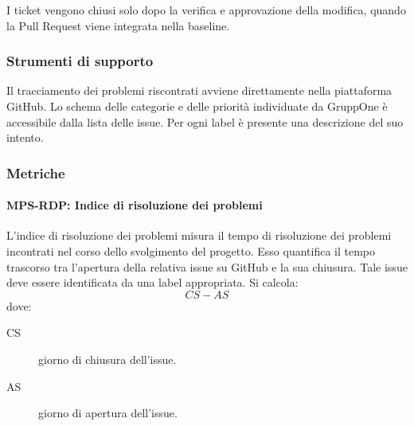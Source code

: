 \documentclass[../../norme-di-progetto.tex]{subfiles}
\begin{document}
I ticket vengono chiusi solo dopo la verifica e approvazione della modifica, quando la Pull Request viene integrata nella baseline.

\subsubsection{Strumenti di supporto}%
\label{subs:risoluzione_dei_problemi/strumenti_di_supporto}

Il tracciamento dei problemi riscontrati avviene direttamente nella piattaforma GitHub.
Lo schema delle categorie e delle priorità individuate da GruppOne è accessibile dalla lista delle issue. Per ogni label è presente una descrizione del suo intento.

\subsubsection{Metriche}%
\label{subs:processo_di_risoluzione_dei_problemi/metriche}

\paragraph{MPS-RDP: Indice di risoluzione dei problemi}%
\label{par:MPS-RDP_indice_di_risoluzione_dei_problemi}

L'indice di risoluzione dei problemi misura il tempo di risoluzione dei problemi incontrati nel corso dello svolgimento del progetto.
Esso quantifica il tempo trascorso tra l'apertura della relativa issue su GitHub e la sua chiusura. Tale issue deve essere identificata da una label appropriata. Si calcola:
\[
  CS-AS
\]
dove:
\begin{description}
  \item [CS] giorno di chiusura dell'issue.
  \item [AS] giorno di apertura dell'issue.
\end{description}
\end{document}
